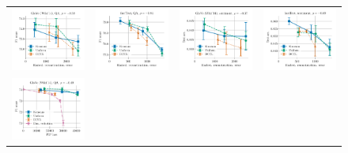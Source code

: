 \begin{figure}
	\centering
	\begin{tabular}{@{\hskip -0.0in}c@{\hskip -0.0in}c@{\hskip -0.0in}c@{\hskip -0.0in}c@{\hskip -0.0in}}
		\includegraphics[width=.245\linewidth]{figures/glove400k_qa_best-f1_vs_embed-frob-error_linx_det.pdf} &
		\includegraphics[width=.245\linewidth]{figures/fasttext1m_qa_best-f1_vs_embed-frob-error_linx_det.pdf} &
		\includegraphics[width=.245\linewidth]{figures/glove400k_sentiment_sst_test-acc_vs_embed-frob-error_linx_det.pdf} &
		\includegraphics[width=.245\linewidth]{figures/fasttext1m_sentiment_sst_test-acc_vs_embed-frob-error_linx_det.pdf} \\
		\includegraphics[width=.245\linewidth]{figures/glove400k_qa_best-f1_vs_gram-large-dim-frob-error_linx_det.pdf} &

\end{tabular}
\end{figure}
